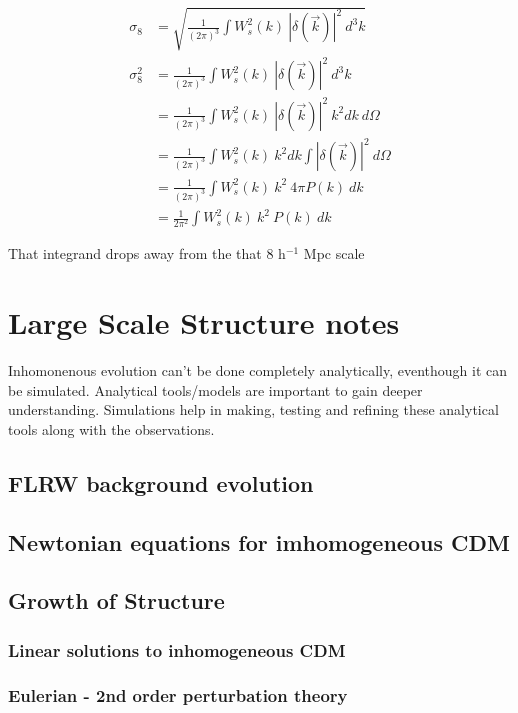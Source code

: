 \documentclass[12pt]{article}
\begin{document}
\begin{align}
\sigma_8 &= \sqrt{ \frac{1}{(2 \pi)^3} \int W_s^2(k) ~|\delta (\vec{k})|^2 ~d^3k}\\
\sigma_8^2 &=  \frac{1}{(2 \pi)^3} \int W_s^2(k) ~|\delta (\vec{k})|^2 ~d^3k\\
&= \frac{1}{(2 \pi)^3} \int W_s^2(k) ~|\delta (\vec{k})|^2 ~k^2 dk ~d\Omega\\
&= \frac{1}{(2 \pi)^3} \int W_s^2(k) ~k^2 dk \int |\delta (\vec{k})|^2  ~d\Omega\\
&= \frac{1}{(2 \pi)^3} \int W_s^2(k) ~k^2 ~4\pi P(k) ~dk\\
&= \frac{1}{2 \pi^2} \int W_s^2(k) ~k^2 ~P(k) ~dk
\end{align}

That integrand drops away from the that 8 h$^{-1}$ Mpc scale

\section{Large Scale Structure notes}

Inhomonenous evolution can't be done completely analytically, eventhough it can be simulated. Analytical tools/models are important to gain deeper understanding.  Simulations help in making, testing and refining these analytical tools along with the observations.\\

\subsection{FLRW background evolution}

\subsection{Newtonian equations for imhomogeneous CDM}

\subsection{Growth of Structure}

\subsubsection{Linear solutions to inhomogeneous CDM}
\subsubsection{Eulerian - 2nd order perturbation theory}
\end{document}
